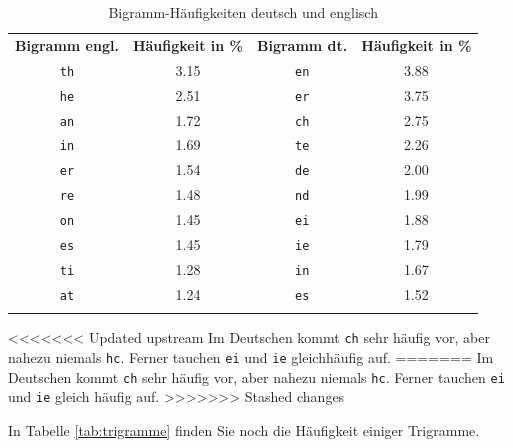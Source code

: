\documentclass[%
<<<<<<< Updated upstream
11pt,%
twoside,%
titlepage,%
german,%
headsepline%
]{scrartcl}
\newcommand{\spaltenheight}{\rule{0mm}{3ex}}
\newcommand{\spaltensep}{\\[1ex]}
\begin{document}
\begin{table}
\begin{center}
\begin{tabular}{|c|c||c|c|}
\hhline{--||--}
\rowcolor{lightyellow}\spaltenheight \textbf{Bigramm engl.} &	\textbf{Häufigkeit in \%} &	\textbf{Bigramm dt.} &	\textbf{Häufigkeit in \%}\spaltensep\hhline{--||--}
\rowcolor{Gray}\spaltenheight \texttt{th}&	3.15&	\texttt{en}&	3.88\spaltensep\hhline{--||--}
\rowcolor{lightyellow}\spaltenheight \texttt{he}&	2.51&	\texttt{er}&	3.75\spaltensep\hhline{--||--}
\rowcolor{Gray}\spaltenheight \texttt{an}&	1.72&	\texttt{ch}&	2.75\spaltensep\hhline{--||--}
\rowcolor{lightyellow}\spaltenheight \texttt{in}&	1.69&	\texttt{te}&	2.26\spaltensep\hhline{--||--}
\rowcolor{Gray}\spaltenheight \texttt{er}&	1.54&	\texttt{de}&	2.00\spaltensep\hhline{--||--}
\rowcolor{lightyellow}\spaltenheight \texttt{re}&	1.48&	\texttt{nd}&	1.99\spaltensep\hhline{--||--}
\rowcolor{Gray}\spaltenheight \texttt{on}&	1.45&	\texttt{ei}&	1.88\spaltensep\hhline{--||--}
\rowcolor{lightyellow}\spaltenheight \texttt{es}&	1.45&	\texttt{ie}&	1.79\spaltensep\hhline{--||--}
\rowcolor{Gray}\spaltenheight \texttt{ti}&	1.28&	\texttt{in}&	1.67\spaltensep\hhline{--||--}
\rowcolor{lightyellow}\spaltenheight \texttt{at}&	1.24&	\texttt{es}&	1.52\spaltensep\hhline{--||--}
\end{tabular}
\end{center}
\caption{Bigramm-Häufigkeiten deutsch und englisch}\label{tab:bigramme}
\end{table}

<<<<<<< Updated upstream
Im Deutschen kommt \texttt{ch} sehr häufig vor, aber nahezu niemals \texttt{hc}. Ferner tauchen \texttt{ei} und \texttt{ie} gleichhäufig auf.
=======
Im Deutschen kommt \texttt{ch} sehr häufig vor, aber nahezu niemals \texttt{hc}. Ferner tauchen \texttt{ei} und \texttt{ie} gleich häufig auf.
>>>>>>> Stashed changes

In Tabelle \ref{tab:trigramme} finden Sie noch die Häufigkeit einiger Trigramme.
\end{document}
